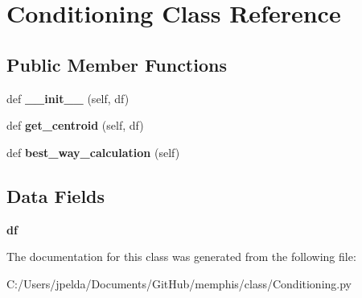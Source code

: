 \hypertarget{class_conditioning_1_1_conditioning}{}\section{Conditioning Class Reference}
\label{class_conditioning_1_1_conditioning}
\subsection*{Public Member Functions}
\begin{DoxyCompactItemize}
\item 
\mbox{\label{class_conditioning_1_1_conditioning_ac1251a790ece898aa63d980925210317}} 
def {\bfseries \+\_\+\+\_\+init\+\_\+\+\_\+} (self, df)
\item 
\mbox{\label{class_conditioning_1_1_conditioning_a39a5ba93ac164f8b43e420c083c2088c}} 
def {\bfseries get\+\_\+centroid} (self, df)
\item 
\mbox{\label{class_conditioning_1_1_conditioning_a060addd836d43ea25511c292ec16344b}} 
def {\bfseries best\+\_\+way\+\_\+calculation} (self)
\end{DoxyCompactItemize}
\subsection*{Data Fields}
\begin{DoxyCompactItemize}
\item 
\mbox{\label{class_conditioning_1_1_conditioning_ab52c96bea30646abf8170f333bbd42b9}} 
{\bfseries df}
\end{DoxyCompactItemize}


The documentation for this class was generated from the following file\+:\begin{DoxyCompactItemize}
\item 
C\+:/\+Users/jpelda/\+Documents/\+Git\+Hub/memphis/class/Conditioning.\+py\end{DoxyCompactItemize}
